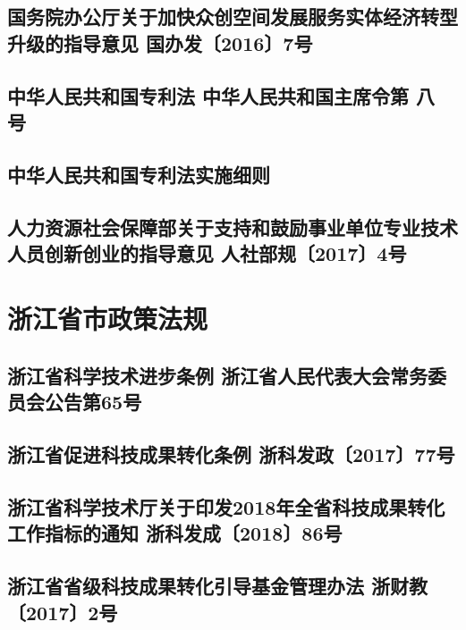 \documentclass[openany]{book}
\begin{document}
\section{国务院办公厅关于加快众创空间发展服务实体经济转型升级的指导意见	国办发〔2016〕7号}


\section{中华人民共和国专利法	中华人民共和国主席令第 八 号}


\section{中华人民共和国专利法实施细则}


\section{人力资源社会保障部关于支持和鼓励事业单位专业技术人员创新创业的指导意见 人社部规〔2017〕4号}



\chapter{浙江省市政策法规}


\section{浙江省科学技术进步条例	浙江省人民代表大会常务委员会公告第65号}


\section{ 浙江省促进科技成果转化条例 浙科发政〔2017〕77号}


\section{浙江省科学技术厅关于印发2018年全省科技成果转化工作指标的通知 浙科发成〔2018〕86号}


\section{ 浙江省省级科技成果转化引导基金管理办法 浙财教〔2017〕2号}

\end{document}
